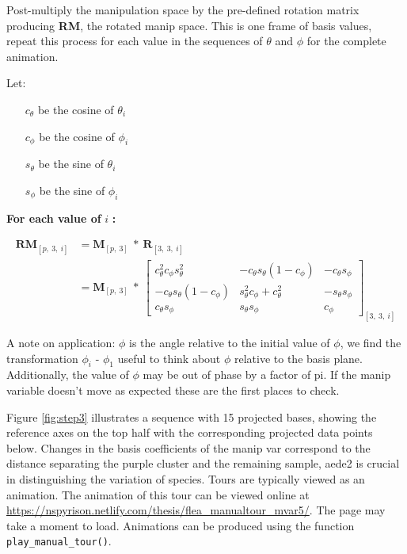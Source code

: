 Post-multiply the manipulation space by the pre-defined rotation matrix
producing \textbf{RM}, the rotated manip space. This is one frame of
basis values, repeat this process for each value in the sequences of
\(\theta\) and \(\phi\) for the complete animation.

Let:

\begin{itemize}
  \item[$c_\theta$] be the cosine of $\theta_i$
  \item[$c_\phi$]   be the cosine of $\phi_i$
  \item[$s_\theta$] be the sine of   $\theta_i$
  \item[$s_\phi$]   be the sine of   $\phi_i$
\end{itemize}

\textbf{For each value of } \(i\) \textbf{:}

\begin{align*}
  \textbf{RM}_{[p,~3,~i]}
  &= \textbf{M}_{[p,~3]} ~*~ \textbf{R}_{[3,~3,~i]} \\
  &= \textbf{M}_{[p,~3]}
    ~*~
  \begin{bmatrix}
    c_\theta^2 c_\phi s_\theta^2 &
    -c_\theta s_\theta (1 - c_\phi) &
    -c_\theta s_\phi \\
    -c_\theta s_\theta (1 - c_\phi) &
    s_\theta^2 c_\phi + c_\theta^2 &
    -s_\theta s_\phi \\
    c_\theta s_\phi &
    s_\theta s_\phi &
    c_\phi
  \end{bmatrix}_{[3,~3,~i]}
\end{align*}

A note on application: \(\phi\) is the angle relative to the initial
value of \(\phi\), we find the transformation \(\phi_i\) - \(\phi_1\)
useful to think about \(\phi\) relative to the basis plane.
Additionally, the value of \(\phi\) may be out of phase by a factor of
pi. If the manip variable doesn't move as expected these are the first
places to check.

Figure \ref{fig:step3} illustrates a sequence with 15 projected bases,
showing the reference axes on the top half with the corresponding
projected data points below. Changes in the basis coefficients of the
manip var correspond to the distance separating the purple cluster and
the remaining sample, aede2 is crucial in distinguishing the variation
of species. Tours are typically viewed as an animation. The animation of
this tour can be viewed online at
\url{https://nspyrison.netlify.com/thesis/flea_manualtour_mvar5/}. The
page may take a moment to load. Animations can be produced using the
function \texttt{play\_manual\_tour()}.

